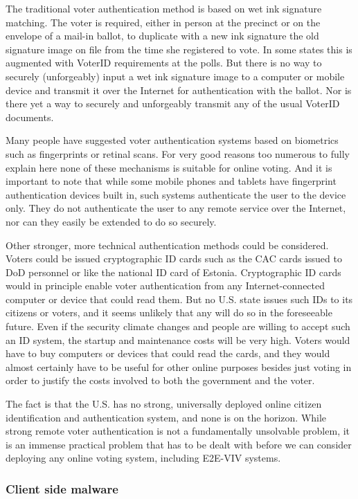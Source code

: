 The traditional voter authentication method is based on wet ink
signature matching. The voter is required, either in person at the
precinct or on the envelope of a mail-in ballot, to duplicate with a
new ink signature the old signature image on file from the time she
registered to vote. In some states this is augmented with VoterID
requirements at the polls. But there is no way to securely
(unforgeably) input a wet ink signature image to a computer or mobile
device and transmit it over the Internet for authentication with the
ballot. Nor is there yet a way to securely and unforgeably transmit
any of the usual VoterID documents.

Many people have suggested voter authentication systems based on
biometrics such as fingerprints or retinal scans. For very good
reasons too numerous to fully explain here none of these mechanisms is
suitable for online voting. And it is important to note that while
some mobile phones and tablets have fingerprint authentication devices
built in, such systems authenticate the user to the device only. They
do not authenticate the user to any remote service over the Internet,
nor can they easily be extended to do so securely.

Other stronger, more technical authentication methods could be
considered.  Voters could be issued cryptographic ID cards such as the
CAC cards issued to DoD personnel or like the national ID card of
Estonia. Cryptographic ID cards would in principle enable voter
authentication from any Internet-connected computer or device that
could read them. But no U.S. state issues such IDs to its citizens or
voters, and it seems unlikely that any will do so in the foreseeable
future. Even if the security climate changes and people are willing to
accept such an ID system, the startup and maintenance costs will be
very high.  Voters would have to buy computers or devices that could
read the cards, and they would almost certainly have to be useful for
other online purposes besides just voting in order to justify the
costs involved to both the government and the voter.

The fact is that the U.S. has no strong, universally deployed online
citizen identification and authentication system, and none is on the
horizon. While strong remote voter authentication is not a
fundamentally unsolvable problem, it is an immense practical problem
that has to be dealt with before we can consider deploying any online
voting system, including E2E-VIV systems.

\subsubsection{Client side malware}

